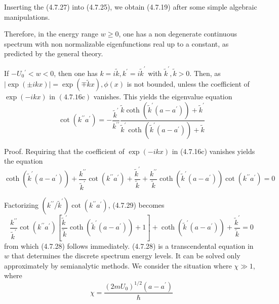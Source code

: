 \documentclass{article}
\begin{document}
Inserting the (4.7.27) into (4.7.25), we obtain (4.7.19) after some simple algebraic manipulations.

Therefore, in the energy range $w \geq 0$, one has a non degenerate continuous spectrum with non normalizable eigenfunctions real up to a constant, as predicted by the general theory.

If $-U_{0}{ }^{\prime}<w<0$, then one has $k=i \tilde{k}, k^{\prime}=i \tilde{k}^{\prime}$ with $\tilde{k}^{\prime}, \tilde{k}>0$. Then, as $|\exp ( \pm i k x)|=\exp (\mp \tilde{k} x), \phi(x)$ is not bounded, unless the coefficient of $\exp (-i k x)$ in $(4.7 .16 \mathrm{c})$ vanishes. This yields the eigenvalue equation
$$
\begin{equation*}
\cot \left(k^{\prime \prime} a^{\prime}\right)=-\frac{\tilde{k}^{\prime}}{k^{\prime \prime}} \frac{\tilde{k} \operatorname{coth}\left(\tilde{k}^{\prime}\left(a-a^{\prime}\right)\right)+\tilde{k}^{\prime}}{\tilde{k}^{\prime} \operatorname{coth}\left(\tilde{k}^{\prime}\left(a-a^{\prime}\right)\right)+\tilde{k}} \tag{4.7.28}
\end{equation*}
$$

Proof. Requiring that the coefficient of $\exp (-i k x)$ in (4.7.16c) vanishes yields the equation
$$
\begin{equation*}
\operatorname{coth}\left(\tilde{k}^{\prime}\left(a-a^{\prime}\right)\right)+\frac{k^{\prime \prime}}{\tilde{k}^{\prime}} \cot \left(k^{\prime \prime} a^{\prime}\right)+\frac{\tilde{k}^{\prime}}{\tilde{k}}+\frac{k^{\prime \prime}}{\tilde{k}} \operatorname{coth}\left(\tilde{k}^{\prime}\left(a-a^{\prime}\right)\right) \cot \left(k^{\prime \prime} a^{\prime}\right)=0 \tag{4.7.29}
\end{equation*}
$$

Factorizing $\left(k^{\prime \prime} / \tilde{k}^{\prime}\right) \cot \left(k^{\prime \prime} a^{\prime}\right)$, (4.7.29) becomes
$$
\begin{equation*}
\frac{k^{\prime \prime}}{\tilde{k}^{\prime}} \cot \left(k^{\prime \prime} a^{\prime}\right)\left[\frac{\tilde{k}^{\prime}}{\tilde{k}} \operatorname{coth}\left(\tilde{k}^{\prime}\left(a-a^{\prime}\right)\right)+1\right]+\operatorname{coth}\left(\tilde{k}^{\prime}\left(a-a^{\prime}\right)\right)+\frac{\tilde{k}^{\prime}}{\tilde{k}}=0 \tag{4.7.30}
\end{equation*}
$$
from which (4.7.28) follows immediately.
(4.7.28) is a transcendental equation in $w$ that determines the discrete spectrum energy levels. It can be solved only approximately by semianalytic methods. We consider the situation where $\chi \gg 1$, where
$$
\begin{equation*}
\chi=\frac{\left(2 m U_{0}\right)^{1 / 2}\left(a-a^{\prime}\right)}{\hbar} \tag{4.7.31}
\end{equation*}
$$
\end{document}

